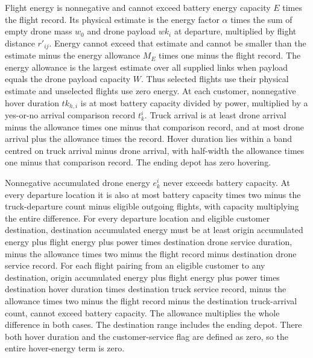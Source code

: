 \documentclass[10pt]{article}
\begin{document}
Flight energy is nonnegative and cannot exceed battery energy capacity $E$ times the flight record. Its physical estimate is the energy factor $\alpha$ times the sum of empty drone mass $w_0$ and drone payload $wk_i$ at departure, multiplied by flight distance $r'_{ij}$. Energy cannot exceed that estimate and cannot be smaller than the estimate minus the energy allowance $M_E$ times one minus the flight record. The energy allowance is the largest estimate over all supplied links when payload equals the drone payload capacity $W$. Thus selected flights use their physical estimate and unselected flights use zero energy. At each customer, nonnegative hover duration $tk_{h,i}$ is at most battery capacity divided by power, multiplied by a yes-or-no arrival comparison record $t_k^i$. Truck arrival is at least drone arrival minus the allowance times one minus that comparison record, and at most drone arrival plus the allowance times the record. Hover duration lies within a band centred on truck arrival minus drone arrival, with half-width the allowance times one minus that comparison record. The ending depot has zero hovering.

Nonnegative accumulated drone energy $e_k^i$ never exceeds battery capacity. At every departure location it is also at most battery capacity times two minus the truck-departure count minus eligible outgoing flights, with capacity multiplying the entire difference. For every departure location and eligible customer destination, destination accumulated energy must be at least origin accumulated energy plus flight energy plus power times destination drone service duration, minus the allowance times two minus the flight record minus destination drone service record. For each flight pairing from an eligible customer to any destination, origin accumulated energy plus flight energy plus power times destination hover duration times destination truck service record, minus the allowance times two minus the flight record minus the destination truck-arrival count, cannot exceed battery capacity. The allowance multiplies the whole difference in both cases. The destination range includes the ending depot. There both hover duration and the customer-service flag are defined as zero, so the entire hover-energy term is zero.
\end{document}
